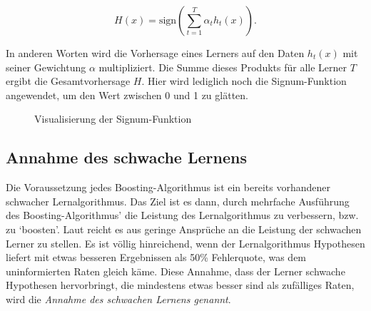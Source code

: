 \begin{equation}
    H(x) = \text{sign}\left(\sum_{t=1}^{T} \alpha_t h_t(x)\right).
\end{equation}
    
In anderen Worten wird die Vorhersage eines Lerners auf den Daten \( h_t(x) \) mit seiner Gewichtung \( \alpha \) multipliziert. Die Summe dieses Produkts für alle Lerner \( T \) ergibt die Gesamtvorhersage \( H \). Hier wird lediglich noch die Signum-Funktion angewendet, um den Wert zwischen 0 und 1 zu glätten.

\begin{figure}[h]
    \centering
    \caption{Visualisierung der Signum-Funktion}
    \label{fig:signum_function}
\end{figure}

\subsection{Annahme des schwache Lernens}
\label{sec:assumptionOfWeakLearning}
Die Voraussetzung jedes Boosting-Algorithmus ist ein bereits vorhandener schwacher Lernalgorithmus. Das Ziel ist es dann, durch mehrfache Ausführung des Boosting-Algorithmus' die Leistung des Lernalgorithmus zu verbessern, bzw. zu `boosten'. Laut \textcite[S. S.~4]{SchapireFreund2012} reicht es aus geringe Ansprüche an die Leistung der schwachen Lerner zu stellen. Es ist völlig hinreichend, wenn der Lernalgorithmus Hypothesen liefert mit etwas besseren Ergebnissen als 50\% Fehlerquote, was dem uninformierten Raten gleich käme.
\newline
Diese Annahme, dass der Lerner schwache Hypothesen hervorbringt, die mindestens etwas besser sind als zufälliges Raten, wird die \textit{Annahme des schwachen Lernens genannt}.